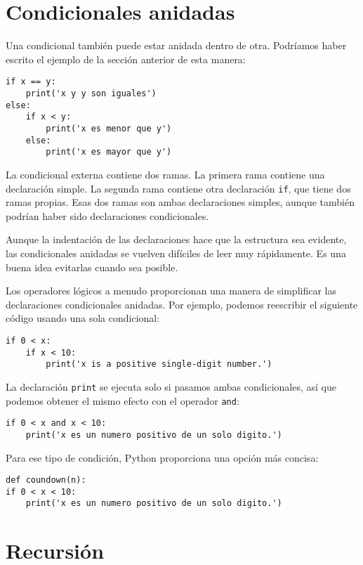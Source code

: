 \section{Condicionales anidadas}

Una condicional también puede estar anidada dentro de otra. Podríamos haber escrito el ejemplo de la sección anterior de esta manera:

\begin{lstlisting}
if x == y:
    print('x y y son iguales')
else:
    if x < y:
        print('x es menor que y')
    else:
        print('x es mayor que y')
\end{lstlisting}

La condicional externa contiene dos ramas. La primera rama contiene una declaración simple. La segunda rama contiene otra declaración \texttt{if}, que tiene dos ramas propias. Esas dos ramas son ambas declaraciones simples, aunque también podrían haber sido declaraciones condicionales.

Aunque la indentación de las declaraciones hace que la estructura sea evidente, las condicionales anidadas se vuelven difíciles de leer muy rápidamente. Es una buena idea evitarlas cuando sea posible.

Los operadores lógicos a menudo proporcionan una manera de simplificar las declaraciones condicionales anidadas. Por ejemplo, podemos reescribir el siguiente código usando una sola condicional:

\begin{lstlisting}
if 0 < x:
    if x < 10:
        print('x is a positive single-digit number.')
\end{lstlisting}

La declaración \texttt{print} se ejecuta solo si pasamos ambas condicionales, así que podemos obtener el mismo efecto con el operador \texttt{and}:

\begin{lstlisting}
if 0 < x and x < 10:
    print('x es un numero positivo de un solo digito.')
\end{lstlisting}

Para ese tipo de condición, Python proporciona una opción más concisa:

\begin{lstlisting}
def coundown(n):
if 0 < x < 10:
    print('x es un numero positivo de un solo digito.')
\end{lstlisting}

\section{Recursión}

